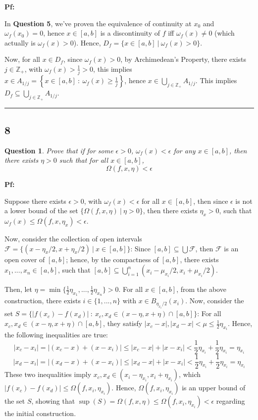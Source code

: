 \documentclass{article}
\newtheorem{question}{Question}
\begin{document}
\textbf{Pf:}

In \textbf{Question 5}, we've proven the equivalence of continuity at $x_0$ and $\omega_f(x_0)=0$, hence $x\in[a,b]$ is a discontinuity of $f$
iff $\omega_f(x)\neq 0$ (which actually is $\omega_f(x)>0$). Hence, $D_f=\{x\in[a,b]\ |\ \omega_f(x)>0\}$.

Now, for all $x\in D_f$, since $\omega_f(x)>0$, by Archimedean's Property, there exists $j\in\mathbb{Z}_+$, with $\omega_f(x)>\frac{1}{j}>0$,
this implies $x\in A_{1/j}=\left\{x\in[a,b]\ :\ \omega_f(x)\geq \frac{1}{j}\right\}$, hence $x\in \bigcup_{j\in\mathbb{Z}_+}A_{1/j}$. This implies $D_f\subseteq \bigcup_{j\in\mathbb{Z}_+}A_{1/j}$.

\hfill

\rule{15.5cm}{0.1mm}

\hfill

\subsection*{8}
\begin{myBox2}[]{}
    \begin{question}
        Prove that if for some $\epsilon>0$, $\omega_f(x)<\epsilon$ for any $x\in[a,b]$, then
        there exists $\eta>0$ such that for all $x\in[a,b]$,
        $$\Omega(f,x,\eta)<\epsilon$$
    \end{question}
\end{myBox2}

\textbf{Pf:}

Suppose there exists $\epsilon>0$, with $\omega_f(x)<\epsilon$ for all $x\in[a,b]$, then since $\epsilon$ is not a lower bound of the set $\{\Omega(f,x,\eta)\ |\ \eta>0\}$,
then there exists $\eta_x>0$, such that $\omega_f(x)\leq \Omega(f,x,\eta_x)<\epsilon$.

Now, consider the collection of open intervals $\mathcal{F}=\{(x-\eta_x/2,x+\eta_x/2)\ |\ x\in[a,b]\}$: Since $[a,b]\subseteq \bigcup\mathcal{F}$, then $\mathcal{F}$ is an open cover of $[a,b]$;
hence, by the compactness of $[a,b]$, there exists $x_1,...,x_n\in [a,b]$, such that $[a,b]\subseteq \bigcup_{i=1}^{n}(x_i-\mu_{x_i}/2,x_i+\mu_{x_i}/2)$.

\hfill

Then, let $\eta=\min\{\frac{1}{2}\eta_{x_1},...,\frac{1}{2}\eta_{x_n}\}>0$. For all $x\in[a,b]$, from the above construction, there exists $i\in\{1,...,n\}$ with $x\in B_{\eta_{x_i}/2}(x_i)$.
Now, consider the set $S=\{|f(x_c)-f(x_d)|\ :\ x_c,x_d\in (x-\eta,x+\eta)\cap [a,b]\}$:
For all $x_c,x_d\in (x-\eta,x+\eta)\cap [a,b]$, they satisfy $|x_c-x|,|x_d-x|<\mu \leq \frac{1}{2}\eta_{x_i}$. Hence, the following inequalities are true:
$$|x_c-x_i| = |(x_c-x)+(x-x_i)| \leq |x_c-x|+|x-x_i| < \frac{1}{2}\eta_{x_i}+\frac{1}{2}\eta_{x_i}=\eta_{x_i}$$
$$|x_d-x_i| = |(x_d-x)+(x-x_i)| \leq |x_d-x|+|x-x_i| < \frac{1}{2}\eta_{x_i}+\frac{1}{2}\eta_{x_i} = \eta_{x_i}$$
These two inequalities imply $x_c,x_d\in (x_i-\eta_{x_i},x_i+\eta_{x_i})$, which $|f(x_c)-f(x_d)|\leq\Omega(f,x_i,\eta_{x_i})$.
Hence, $\Omega(f,x_i,\eta_{x_i})$ is an upper bound of the set $S$, showing that $\sup(S)=\Omega(f,x,\eta)\leq \Omega(f,x_i,\eta_{x_i}) < \epsilon$ regarding the initial construction.
\end{document}
